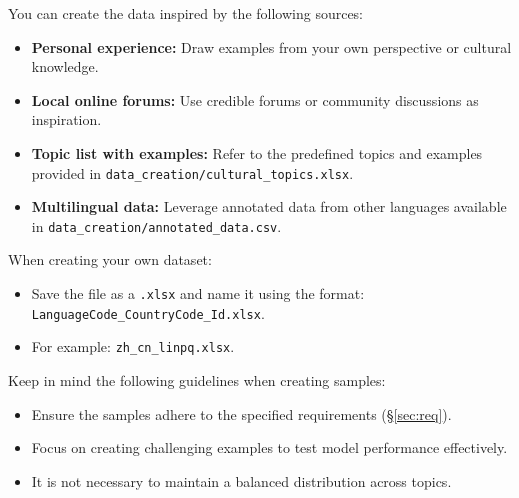 \documentclass[11pt]{article}
\begin{document}
\noindent You can create the data inspired by the following sources:
\begin{itemize}
    \item \textbf{Personal experience:} Draw examples from your own perspective or cultural knowledge.
    \item \textbf{Local online forums:} Use credible forums or community discussions as inspiration.
    \item \textbf{Topic list with examples:} Refer to the predefined topics and examples provided in \texttt{data\_creation/cultural\_topics.xlsx}.
    \item \textbf{Multilingual data:} Leverage annotated data from other languages available in \texttt{data\_creation/annotated\_data.csv}.
\end{itemize}

\noindent When creating your own dataset:
\begin{itemize}
    \item Save the file as a \texttt{.xlsx} and name it using the format: \texttt{LanguageCode\_CountryCode\_Id.xlsx}. 
    \item For example: \texttt{zh\_cn\_linpq.xlsx}.
\end{itemize}

\noindent Keep in mind the following guidelines when creating samples:
\begin{itemize}
    \item Ensure the samples adhere to the specified requirements (\S\ref{sec:req}).
    \item Focus on creating challenging examples to test model performance effectively.
    \item It is not necessary to maintain a balanced distribution across topics.
\end{itemize}

% 
\end{document}
